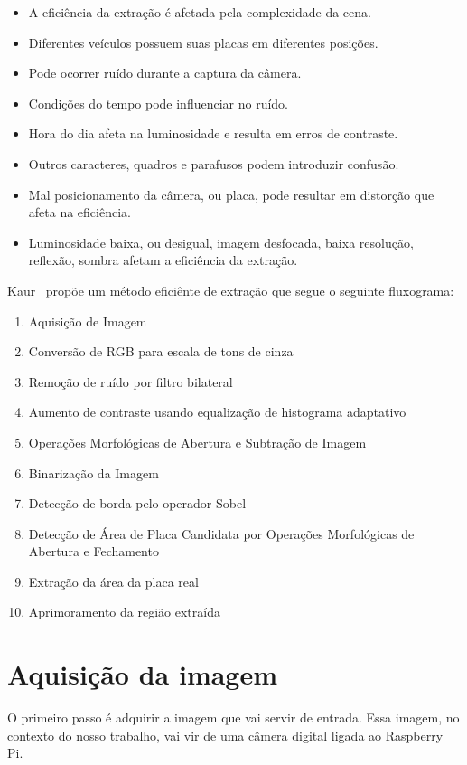 \begin{itemize}
	\item A eficiência da extração é afetada pela complexidade da cena.
	\item Diferentes veículos possuem suas placas em diferentes posições.
	\item Pode ocorrer ruído durante a captura da câmera.
	\item Condições do tempo pode influenciar no ruído.
	\item Hora do dia afeta na luminosidade e resulta em erros de contraste.
	\item Outros caracteres, quadros e parafusos podem introduzir confusão.
	\item Mal posicionamento da câmera, ou placa, pode resultar em distorção que afeta na eficiência.
	\item Luminosidade baixa, ou desigual, imagem desfocada, baixa resolução, reflexão, sombra afetam a eficiência da extração.
\end{itemize}

Kaur~\cite{kaur2014efficient} propõe um método eficiênte de
extração que segue o seguinte fluxograma:

\begin{enumerate}
	\item Aquisição de Imagem
	\item Conversão de RGB para escala de tons de cinza
	\item Remoção de ruído por filtro bilateral
	\item Aumento de contraste usando equalização de histograma adaptativo
	\item Operações Morfológicas de Abertura e Subtração de Imagem
	\item Binarização da Imagem
	\item Detecção de borda pelo operador Sobel
	\item Detecção de Área de Placa Candidata por Operações Morfológicas de Abertura e Fechamento
	\item Extração da área da placa real
	\item Aprimoramento da região extraída
\end{enumerate}

\section{Aquisição da imagem}

O primeiro passo é adquirir a imagem que vai servir de entrada. Essa imagem, no
contexto do nosso trabalho, vai vir de uma câmera digital ligada ao Raspberry
Pi.

